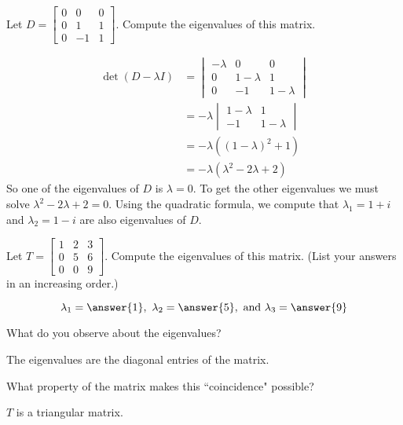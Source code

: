 \documentclass{ximera}
\begin{document}
\begin{example}\label{ex:3x3_complex_eig}
Let $D=\begin{bmatrix} 0&0&0\\ 0 &1&1\\ 0 & -1&1\end{bmatrix}$.  Compute the eigenvalues of this matrix.
    
\begin{explanation}
\begin{align*}\det(D-\lambda I)&=\begin{vmatrix} -\lambda&0&0\\ 0 &1-\lambda&1\\ 0 & -1&1-\lambda\end{vmatrix}\\
&=-\lambda\begin{vmatrix}1-\lambda&1\\-1&1-\lambda\end{vmatrix}\\
&=-\lambda((1-\lambda)^2+1)\\
&=-\lambda(\lambda^2-2\lambda+2)
\end{align*}
So one of the eigenvalues of $D$ is $\lambda=0$.  To get the other eigenvalues we must solve $\lambda^2-2\lambda+2=0$.  Using the quadratic formula, we compute that $\lambda_1=1+i$ and $\lambda_2=1-i$ are also eigenvalues of $D$.
\end{explanation}
\end{example}


    
\begin{exploration}\label{init:3x3tri}
Let $T=\begin{bmatrix} 1 & 2 & 3\\ 0 & 5 & 6\\ 0 & 0 & 9\end{bmatrix}$.  Compute the eigenvalues of this matrix.  (List your answers in an increasing order.)
    
$$\lambda_1=\answer{1},\quad\lambda_2=\answer{5},\quad\text{and}\quad\lambda_3=\answer{9}$$
    
What do you observe about the eigenvalues?
\begin{hint}
The eigenvalues are the diagonal entries of the matrix.
\end{hint}
    
What property of the matrix makes this ``coincidence" possible?
    
\begin{hint}
$T$ is a triangular matrix.
\end{hint}
\end{exploration}
    
\end{document}

